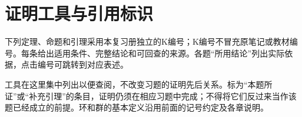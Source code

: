 \documentclass[UTF8,a4paper,11pt,fontset=windows]{ctexart}
\theoremstyle{definition}
\begin{document}
\tableofcontents\clearpage
\section*{证明工具与引用标识}
下列定理、命题和引理采用本复习册独立的K编号；K编号不冒充原笔记或教材编号。每条给出适用条件、完整结论和可回查的来源。各题“所用结论”列出实际依据，点击编号可跳转到对应表述。

工具在这里集中列出以便查阅，不改变习题的证明先后关系。标为“本题所证”或“补充引理”的条目，证明仍须在相应习题中完成；不得将它们反过来当作该题已经成立的前提。环和群的基本定义沿用前面的记号约定及各章说明。
\setcounter{secnumdepth}{0}




\setcounter{secnumdepth}{2}
\clearpage

\clearpage
\clearpage
\clearpage
\clearpage
\end{document}
